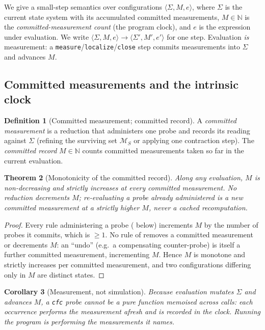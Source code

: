 \documentclass[11pt,a4paper]{article}
\theoremstyle{cfcthm}
\newtheorem{theorem}{Theorem}[section]
\newtheorem{corollary}[theorem]{Corollary}
\theoremstyle{definition}
\newtheorem{definition}[theorem]{Definition}
\theoremstyle{remark}
\newcommand{\N}{\mathbb{N}}
\newcommand{\Man}{\mathcal{M}}          %
\newcommand{\rec}{M}                    %
\newcommand{\stepto}{\longrightarrow}
\newcommand{\cf}[1]{\texttt{#1}}
\begin{document}
We give a small-step semantics \citep{plotkin2004structural} over
configurations $\langle\Sigma,\rec,e\rangle$, where $\Sigma$ is the current
state system with its accumulated committed measurements, $\rec\in\N$ is the
\emph{committed-measurement count} (the program clock), and $e$ is the
expression under evaluation. We write
$\langle\Sigma,\rec,e\rangle\stepto\langle\Sigma',\rec',e'\rangle$ for one
step. Evaluation \emph{is} measurement: a \cf{measure}/\cf{localize}/\cf{close}
step commits measurements into $\Sigma$ and advances $\rec$.

\subsection{Committed measurements and the intrinsic clock}

\begin{definition}[Committed measurement; committed record]
\label{def:committed}
A \emph{committed measurement} is a reduction that administers one probe and
records its reading against $\Sigma$ (refining the surviving set $\Man_S$ or
applying one contraction step). The \emph{committed record} $\rec\in\N$ counts
committed measurements taken so far in the current evaluation.
\end{definition}

\begin{theorem}[Monotonicity of the committed record]
\label{thm:monotone}
Along any evaluation, $\rec$ is non-decreasing and strictly increases at every
committed measurement. No reduction decrements $\rec$; re-evaluating a probe
already administered is a new committed measurement at a strictly higher $\rec$,
never a cached recomputation.
\end{theorem}

\begin{proof}
Every rule administering a probe ( below) increments $\rec$ by the number of probes it commits,
which is $\ge1$. No rule of  removes a committed measurement or
decrements $\rec$: an ``undo'' (e.g.\ a compensating counter-probe) is itself a
further committed measurement, incrementing $\rec$. Hence $\rec$ is monotone and
strictly increases per committed measurement, and two configurations differing
only in $\rec$ are distinct states.
\end{proof}

\begin{corollary}[Measurement, not simulation]
\label{cor:measure}
Because evaluation mutates $\Sigma$ and advances $\rec$, a \cf{cfc} probe cannot
be a pure function memoised across calls: each occurrence performs the
measurement afresh and is recorded in the clock. Running the program \emph{is}
performing the measurements it names.
\end{corollary}
\end{document}
